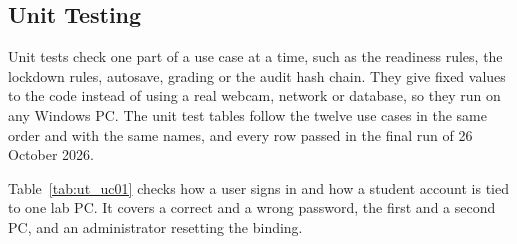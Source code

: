 
\newcommand{\TTHead}{%
\textbf{Test Case} & \textbf{Test Objective} & \textbf{Test Steps} & \textbf{Test Data} & \textbf{Expected Results} & \textbf{Pass/\allowbreak{}Fail}\\ \hline
\endfirsthead
\multicolumn{6}{c}{\footnotesize\tablename~\thetable{} -- continued from previous page}\\ \hline\hline
\textbf{Test Case} & \textbf{Test Objective} & \textbf{Test Steps} & \textbf{Test Data} & \textbf{Expected Results} & \textbf{Pass/\allowbreak{}Fail}\\ \hline
\endhead
\hline \multicolumn{6}{r}{\footnotesize Continued on next page}\\
\endfoot
\hline\hline
\endlastfoot}
\newcommand{\TTStart}{\small\setlength{\tabcolsep}{4pt}\setlength{\doublerulesep}{1pt}}

\subsection{Unit Testing}\label{subsec:unit_tests}
Unit tests check one part of a use case at a time, such as the readiness rules, the lockdown rules, autosave, grading or the audit hash chain. They give fixed values to the code instead of using a real webcam, network or database, so they run on any Windows PC. The unit test tables follow the twelve use cases in the same order and with the same names, and every row passed in the final run of 26 October 2026.

Table~\ref{tab:ut_uc01} checks how a user signs in and how a student account is tied to one lab PC. It covers a correct and a wrong password, the first and a second PC, and an administrator resetting the binding.

